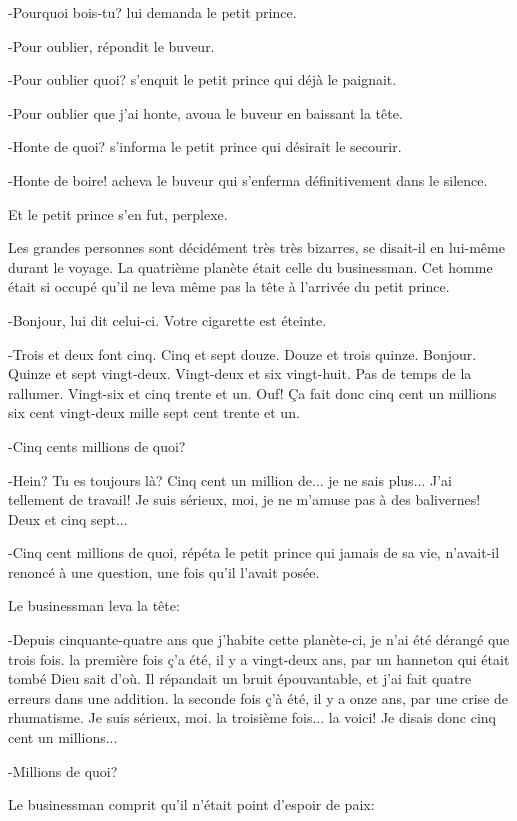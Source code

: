 \documentclass{report}
\begin{document}
-Pourquoi bois-tu? lui demanda le petit prince.

-Pour oublier, répondit le buveur.

-Pour oublier quoi? s'enquit le petit prince qui déjà le paignait.

-Pour oublier que j'ai honte, avoua le buveur en baissant la tête.

-Honte de quoi? s'informa le petit prince qui désirait le secourir.

-Honte de boire! acheva le buveur qui s'enferma définitivement dans le silence.

Et le petit prince s'en fut, perplexe.

Les grandes personnes sont décidément très très bizarres, se disait-il en lui-même durant le voyage.
\parachapter{} %
La quatrième planète était celle du businessman. Cet homme était si occupé qu'il ne leva même pas la tête à l'arrivée du petit prince.

-Bonjour, lui dit celui-ci. Votre cigarette est éteinte.

-Trois et deux font cinq. Cinq et sept douze. Douze et trois quinze. Bonjour. Quinze et sept vingt-deux. Vingt-deux et six vingt-huit. Pas de temps de la rallumer. Vingt-six et cinq trente et un. Ouf! Ça fait donc cinq cent un millions six cent vingt-deux mille sept cent trente et un.


-Cinq cents millions de quoi?

-Hein? Tu es toujours là? Cinq cent un million de... je ne sais plus... J'ai tellement de travail! Je suis sérieux, moi, je ne m'amuse pas à des balivernes! Deux et cinq sept...

-Cinq cent millions de quoi, répéta le petit prince qui jamais de sa vie, n'avait-il renoncé à une question, une fois qu'il l'avait posée.

Le businessman leva la tête:

-Depuis cinquante-quatre ans que j'habite cette planète-ci, je n'ai été dérangé que trois fois. la première fois ç'a été, il y a vingt-deux ans, par un hanneton qui était tombé Dieu sait d'où. Il répandait un bruit épouvantable, et j'ai fait quatre erreurs dans une addition. la seconde fois ç'à été, il y a onze ans, par une crise de rhumatisme. Je suis sérieux, moi. la troisième fois... la voici! Je disais donc cinq cent un millions...

-Millions de quoi?

Le businessman comprit qu'il n'était point d'espoir de paix:
\end{document}

